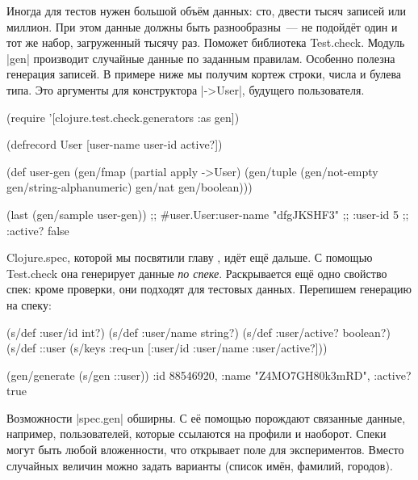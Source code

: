 
Иногда для тестов нужен большой объём данных: сто, двести тысяч записей или
миллион. При этом данные должны быть разнообразны~--- не подойдёт один и тот же
набор, загруженный тысячу раз. Поможет библиотека
Test.check. Модуль \spverb|gen|
производит случайные данные по заданным правилам. Особенно полезна генерация
записей. В примере ниже мы получим кортеж строки, числа и булева типа. Это
аргументы для конструктора \spverb|->User|, будущего пользователя.

\begin{english}
  \begin{clojure}
(require '[clojure.test.check.generators :as gen])

(defrecord User [user-name user-id active?])

(def user-gen
  (gen/fmap (partial apply ->User)
            (gen/tuple (gen/not-empty gen/string-alphanumeric)
                       gen/nat
                       gen/boolean)))

(last (gen/sample user-gen))
;; #user.User{:user-name "dfgJKSHF3"
;;            :user-id 5
;;            :active? false}
  \end{clojure}
\end{english}

Clojure.spec, которой мы посвятили главу , идёт ещё дальше. С
помощью Test.check она генерирует данные \emph{по спеке}. Раскрывается ещё
одно свойство спек: кроме проверки, они подходят для тестовых данных. Перепишем
генерацию на спеку:

\begin{english}
  \begin{clojure}
(s/def :user/id int?)
(s/def :user/name string?)
(s/def :user/active? boolean?)
(s/def ::user (s/keys :req-un [:user/id :user/name :user/active?]))

(gen/generate (s/gen ::user))
{:id 88546920, :name "Z4MO7GH80k3mRD", :active? true}
  \end{clojure}
\end{english}

Возможности \spverb|spec.gen| обширны. С её помощью порождают связанные данные,
например, пользователей, которые ссылаются на профили и наоборот. Спеки могут
быть любой вложенности, что открывает поле для экспериментов. Вместо случайных
величин можно задать варианты (список имён, фамилий, городов).

